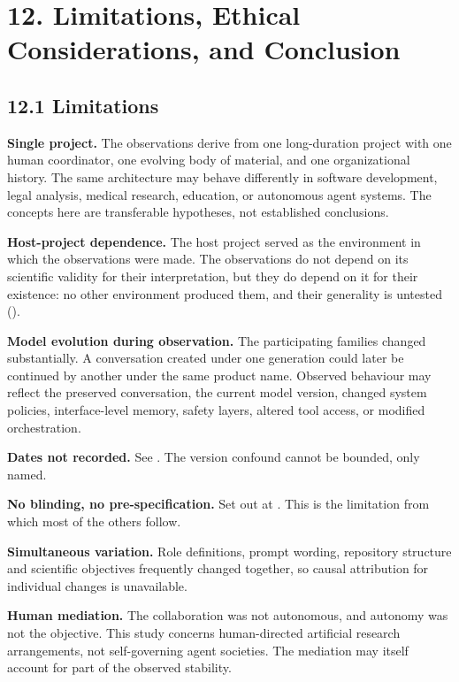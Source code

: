 \section*{12. Limitations, Ethical Considerations, and Conclusion}
\label{sec:en:12}


\subsection*{12.1 Limitations}
\label{sec:en:12.1}

\textbf{Single project.} The observations derive from one long-duration project with one human coordinator, one evolving body of material, and one organizational history. The same architecture may behave differently in software development, legal analysis, medical research, education, or autonomous agent systems. The concepts here are transferable hypotheses, not established conclusions.

\textbf{Host-project dependence.} The host project served as the environment in which the observations were made. The observations do not depend on its scientific validity for their interpretation, but they do depend on it for their existence: no other environment produced them, and their generality is untested ().

\textbf{Model evolution during observation.} The participating families changed substantially. A conversation created under one generation could later be continued by another under the same product name. Observed behaviour may reflect the preserved conversation, the current model version, changed system policies, interface-level memory, safety layers, altered tool access, or modified orchestration.

\textbf{Dates not recorded.} See . The version confound cannot be bounded, only named.

\textbf{No blinding, no pre-specification.} Set out at . This is the limitation from which most of the others follow.

\textbf{Simultaneous variation.} Role definitions, prompt wording, repository structure and scientific objectives frequently changed together, so causal attribution for individual changes is unavailable.

\textbf{Human mediation.} The collaboration was not autonomous, and autonomy was not the objective. This study concerns human-directed artificial research arrangements, not self-governing agent societies. The mediation may itself account for part of the observed stability.

